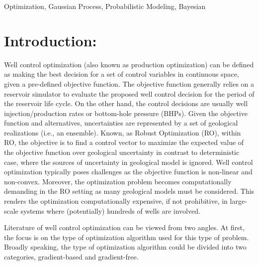 \documentclass[]{elsarticle} %
\begin{document}
\begin{frontmatter}
\begin{abstract}
  \end{abstract}
   \begin{keyword} Optimization, Gaussian Process, Probabilistic Modeling, Bayesian\end{keyword}
 \end{frontmatter}

\newpage

\hypertarget{introduction}{%
\section{Introduction:}\label{introduction}}

\doublespacing

Well control optimization (also known as production optimization) can be defined as making the best decision for a set of control variables in continuous space, given a pre-defined objective function. The objective function generally relies on a reservoir simulator to evaluate the proposed well control decision for the period of the reservoir life cycle. On the other hand, the control decisions are usually well injection/production rates or bottom-hole pressure (BHPs). Given the objective function and alternatives, uncertainties are represented by a set of geological realizations (i.e., an ensemble). Known, as Robust Optimization (RO), within RO, the objective is to find a control vector to maximize the expected value of the objective function over geological uncertainty in contrast to deterministic case, where the sources of uncertainty in geological model is ignored. Well control optimization typically poses challenges as the objective function is non-linear and non-convex. Moreover, the optimization problem becomes computationally demanding in the RO setting as many geological models must be considered. This renders the optimization computationally expensive, if not prohibitive, in large-scale systems where (potentially) hundreds of wells are involved.

Literature of well control optimization can be viewed from two angles. At first, the focus is on the type of optimization algorithm used for this type of problem. Broadly speaking, the type of optimization algorithm could be divided into two categories, gradient-based and gradient-free.
\end{document}
